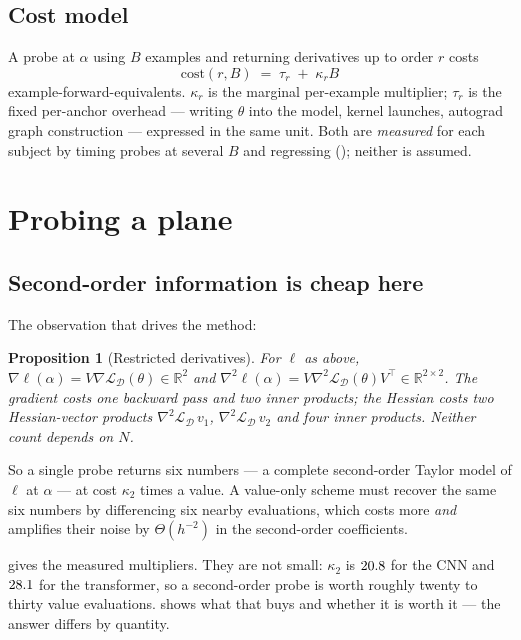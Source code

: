 \documentclass[11pt]{article}
\newtheorem{proposition}[theorem]{Proposition}
\theoremstyle{definition}
\newcommand{\R}{\mathbb{R}}
\newcommand{\Loss}{\mathcal{L}}
\newcommand{\D}{\mathcal{D}}
\begin{document}
\subsection{Cost model}

A probe at $\alpha$ using $B$ examples and returning derivatives up to order $r$ costs
\begin{equation}
  \label{eq:cost}
  \mathrm{cost}(r,B) \;=\; \tau_r \;+\; \kappa_r B
\end{equation}
example-forward-equivalents. $\kappa_r$ is the marginal per-example multiplier;
$\tau_r$ is the fixed per-anchor overhead --- writing $\theta$ into the model, kernel
launches, autograd graph construction --- expressed in the same unit. Both are
\emph{measured} for each subject by timing probes at several $B$ and regressing
(); neither is assumed.

\section{Probing a plane}
\label{sec:probe}

\subsection{Second-order information is cheap here}

The observation that drives the method:

\begin{proposition}[Restricted derivatives]
\label{prop:hvp}
For $\ell$ as above,
$\nabla\ell(\alpha)=V\nabla\Loss_\D(\theta)\in\R^2$ and
$\nabla^2\ell(\alpha)=V\nabla^2\Loss_\D(\theta)V^\top\in\R^{2\times2}$.
The gradient costs one backward pass and two inner products; the Hessian costs two
Hessian-vector products $\nabla^2\Loss_\D\,v_1$, $\nabla^2\Loss_\D\,v_2$
\citep{pearlmutter1994fast} and four inner products. Neither count depends on $N$.
\end{proposition}

So a single probe returns six numbers --- a complete second-order Taylor model of
$\ell$ at $\alpha$ --- at cost $\kappa_2$ times a value. A value-only scheme must
recover the same six numbers by differencing six nearby evaluations, which costs more
\emph{and} amplifies their noise by $\Theta(h^{-2})$ in the second-order coefficients.

 gives the measured multipliers. They are not small: $\kappa_2$ is
$20.8$ for the CNN and $28.1$ for the transformer, so a second-order
probe is worth roughly twenty to thirty value evaluations.  shows
what that buys and  whether it is worth it --- the answer differs
by quantity.
\end{document}
